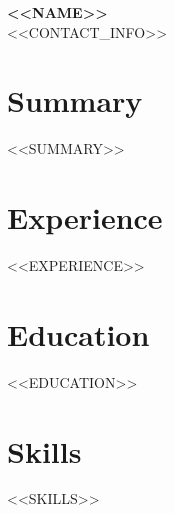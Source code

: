 \documentclass{article}
\begin{document}
\begin{center}
    {\Huge \textbf{<<NAME>>}} \\
    \vspace{2mm}
    <<CONTACT_INFO>>
\end{center}

\vspace{5mm}

\section*{Summary}
<<SUMMARY>>

\section*{Experience}
<<EXPERIENCE>>

\section*{Education}
<<EDUCATION>>

\section*{Skills}
<<SKILLS>>
\end{document}
